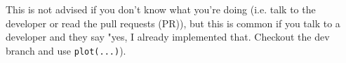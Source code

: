 \documentclass[11pt]{article}
\begin{document}
    This is not advised if you don't know what you're doing (i.e. talk to
the developer or read the pull requests (PR)), but this is common if you
talk to a developer and they say "yes, I already implemented that.
Checkout the dev branch and use \texttt{plot(...)}).


    
    
    
    
\end{document}
